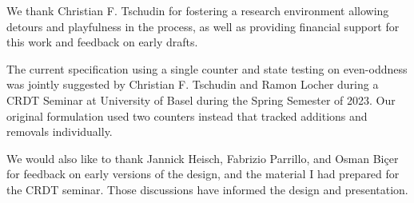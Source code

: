 \documentclass[11pt, oneside]{article}   	%
\begin{document}
We thank Christian F. Tschudin for fostering a research environment allowing detours and playfulness in the process, as well as providing financial support for this work and feedback on early drafts. 

The current specification using a single counter and state testing on even-oddness was jointly suggested by Christian F. Tschudin and Ramon Locher during a CRDT Seminar at University of Basel during the Spring Semester of 2023. Our original formulation used two counters instead that tracked additions and removals individually.

We would also like to thank Jannick Heisch, Fabrizio Parrillo, and Osman Biçer for feedback on early versions of the design, and the material I had prepared for the CRDT seminar. Those discussions have informed the design and presentation.

\newpage



\end{document}
